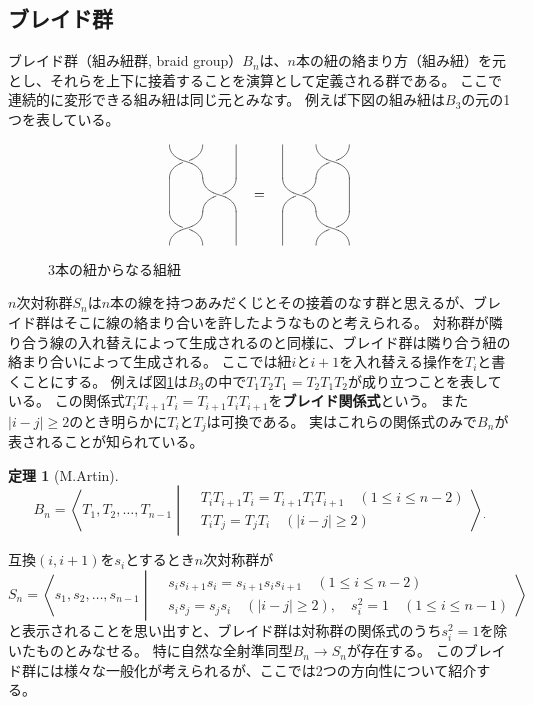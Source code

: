 \documentclass[uplatex,11pt,a4paper,dvipdfmx]{jsarticle}
\numberwithin{equation}{section}
\numberwithin{figure}{section}
\theoremstyle{definition}
\newtheorem{theorem}{定理}[section]
\begin{document}
\subsection{ブレイド群}
ブレイド群（組み紐群, braid group）$B_n$は、$n$本の紐の絡まり方（組み紐）を元とし、それらを上下に接着することを演算として定義される群である。
ここで連続的に変形できる組み紐は同じ元とみなす。
例えば下図の組み紐は$B_3$の元の1つを表している。
\begin{figure}[h]
    \[
        \vcenter{\xy 0;/r2pc/:
        @={(0.5,-0.5),(0,0)}, @@{*{\vtwistneg}},(0,-2),\vtwist,
        @i@={(0,-1),(2,0),(2,-2)} @@{="save";"save"-(0,1),**@{-}}\endxy}
        \quad = \quad
        \vcenter{\xy 0;/r2pc/:
        @={(0.5,0),(0,-0.5),(0.5,-1)}, @@{*{\vtwistneg}},
        @i@={(0,0),(2,-1),(0,-2)} @@{="save";"save"-(0,1),**@{-}}\endxy}
    \]
    \caption{3本の紐からなる組紐}
    \label{fig:example-of-braid}
\end{figure}
$n$次対称群$S_n$は$n$本の線を持つあみだくじとその接着のなす群と思えるが、ブレイド群はそこに線の絡まり合いを許したようなものと考えられる。
対称群が隣り合う線の入れ替えによって生成されるのと同様に、ブレイド群は隣り合う紐の絡まり合いによって生成される。
ここでは紐$i$と$i+1$を入れ替える操作を$T_i$と書くことにする。
例えば図\ref{fig:example-of-braid}は$B_3$の中で$T_1T_2T_1 = T_2T_1T_2$が成り立つことを表している。
この関係式$T_iT_{i+1}T_i = T_{i+1}T_iT_{i+1}$を\textbf{ブレイド関係式}という。
また$|i-j| \geq 2$のとき明らかに$T_i$と$T_j$は可換である。
実はこれらの関係式のみで$B_n$が表されることが知られている。
\begin{theorem}[M.Artin]\label{thm:braid-group-as-artin-group}
    \begin{equation}
        B_n = \left\langle T_1, T_2, \dots, T_{n-1} \middle| \begin{split}
            &T_iT_{i+1}T_i = T_{i+1}T_iT_{i+1} \quad(1\leq i \leq n-2)\\
            &T_iT_j = T_jT_i\quad (|i-j| \geq 2)
        \end{split}\right\rangle {}_.
    \end{equation}
\end{theorem}
互換$(i, i+1)$を$s_i$とするとき$n$次対称群が
\begin{equation}
    S_n = \left\langle s_1, s_2, \dots, s_{n-1} \middle| \begin{split}
          &s_is_{i+1}s_i = s_{i+1}s_is_{i+1} \quad(1\leq i \leq n-2)\\
          &s_is_j = s_js_i\quad (|i-j| \geq 2), \quad s_i^2 = 1 \quad (1 \leq i \leq n-1)
      \end{split}\right\rangle
\end{equation}
と表示されることを思い出すと、ブレイド群は対称群の関係式のうち$s_i^2 = 1$を除いたものとみなせる。
特に自然な全射準同型$B_n \to S_n$が存在する。
このブレイド群には様々な一般化が考えられるが、ここでは2つの方向性について紹介する。
\end{document}
